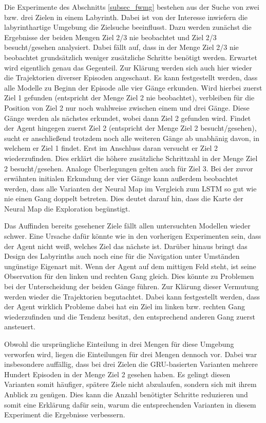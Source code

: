 Die Experimente des Abschnitts \ref{subsec_fwmg} bestehen aus der Suche von zwei bzw. drei Zielen in einem Labyrinth. Dabei ist von der Interesse inwiefern die labyrinthartige Umgebung die Zielsuche beeinflusst. Dazu werden zunächst die Ergebnisse der beiden Mengen \glqq Ziel 2/3 nie beobachtet\grqq{} und \glqq Ziel 2/3 besucht/gesehen\grqq{} analysiert. Dabei fällt auf, dass in der Menge \glqq Ziel 2/3 nie beobachtet\grqq{} grundsätzlich weniger zusätzliche Schritte benötigt werden. Erwartet wird eigentlich genau das Gegenteil. Zur Klärung werden sich auch hier wieder die Trajektorien diverser Episoden angeschaut. Es kann festgestellt werden, dass alle Modelle zu Beginn der Episode alle vier Gänge erkunden. Wird hierbei zuerst Ziel 1 gefunden (entspricht der Menge \glqq Ziel 2 nie beobachtet\grqq{}), verbleiben für die Position von Ziel 2 nur noch wahlweise zwischen einem und drei Gänge. Diese Gänge werden als nächstes erkundet, wobei dann Ziel 2 gefunden wird. Findet der Agent hingegen zuerst Ziel 2 (entspricht der Menge \glqq Ziel 2 besucht/gesehen\grqq{}), sucht er anschließend trotzdem noch alle weiteren Gänge ab unabhänig davon, in welchem er Ziel 1 findet. Erst im Anschluss daran versucht er Ziel 2 wiederzufinden. Dies erklärt die höhere zusätzliche Schrittzahl in der Menge \glqq Ziel 2 besucht/gesehen\grqq{}. Analoge Überlegungen gelten auch für Ziel 3. Bei der zuvor erwähnten initialen Erkundung der vier Gänge kann außerdem beobachtet werden, dass alle Varianten der Neural Map im Vergleich zum LSTM so gut wie nie einen Gang doppelt betreten. Dies deutet darauf hin, dass die Karte der Neural Map die Exploration begünstigt.

Das Auffinden bereits gesehener Ziele fällt allen untersuchten Modellen wieder schwer. Eine Ursache dafür könnte wie in den vorherigen Experimenten sein, dass der Agent nicht weiß, welches Ziel das nächste ist. Darüber hinaus bringt das Design des Labyrinths auch noch eine für die Navigation unter Umständen ungünstige Eigenart mit. Wenn der Agent auf dem mittigen Feld steht, ist seine Observation für den linken und rechten Gang gleich. Dies könnte zu Problemen bei der Unterscheidung der beiden Gänge führen. Zur Klärung dieser Vermutung werden wieder die Trajektorien begutachtet. Dabei kann festgestellt werden, dass der Agent wirklich Probleme dabei hat ein Ziel im linken bzw. rechten Gang wiederzufinden und die Tendenz besitzt, den entsprechend anderen Gang zuerst ansteuert.

Obwohl die ursprüngliche Einteilung in drei Mengen für diese Umgebung verworfen wird, liegen die Einteilungen für drei Mengen dennoch vor. Dabei war insbesondere auffällig, dass bei drei Zielen die GRU-basierten Varianten mehrere Hundert Episoden in der Menge \glqq Ziel 2 gesehen\grqq{} haben. Es gelingt diesen Varianten somit häufiger, spätere Ziele nicht abzulaufen, sondern sich mit ihrem Anblick zu genügen. Dies kann die Anzahl benötigter Schritte reduzieren und somit eine Erklärung dafür sein, warum die entsprechenden Varianten in diesem Experiment die Ergebnisse verbessern.

